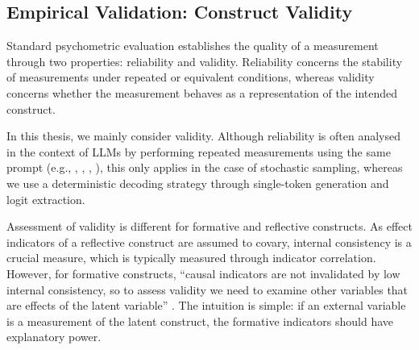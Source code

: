 



\subsection{Empirical Validation: Construct Validity}

Standard psychometric evaluation establishes the quality of a measurement through two properties: reliability and validity. Reliability concerns the stability of measurements under repeated or equivalent conditions, whereas validity concerns whether the measurement behaves as a representation of the intended construct.

In this thesis, we mainly consider validity. Although reliability is often analysed in the context of LLMs by performing repeated measurements using the same prompt (e.g., \citep{manning2025human}, \citep{wang2025evaluating}, \citep{chehbouni2025neither}, \citep{yavuz2025utilizing}), this only applies in the case of stochastic sampling, whereas we use a deterministic decoding strategy through single-token generation and logit extraction. 




\newpage





Assessment of validity is different for formative and reflective constructs. As effect indicators of a reflective construct are assumed to covary, internal consistency is a crucial measure, which is typically measured through indicator correlation. However, for formative constructs, “causal indicators are not invalidated by low internal consistency, so to assess validity we need to examine other variables that are effects of the latent variable” \citep{bollen1991conventional}. The intuition is simple: if an external variable is a measurement of the latent construct, the formative indicators should have explanatory power. %




